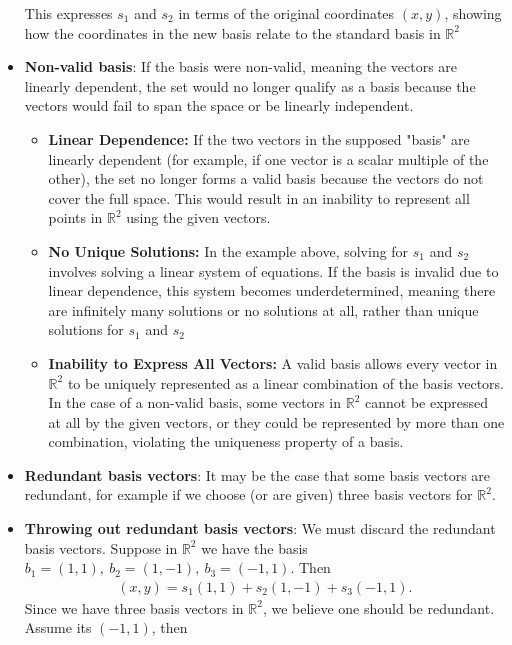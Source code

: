 \documentclass{report}
\begin{document}
\begin{itemize}
            This expresses $s_1$ and $s_2$ in terms of the original coordinates $(x,y)$, showing how the coordinates in the new basis relate to the standard basis in $\mathbb{R}^{2}$
        \item \textbf{Non-valid basis}: If the basis were non-valid, meaning the vectors are linearly dependent, the set would no longer qualify as a basis because the vectors would fail to span the space or be linearly independent.
            \bigbreak \noindent 
            \begin{itemize}
                \item \textbf{Linear Dependence:} If the two vectors in the supposed "basis" are linearly dependent (for example, if one vector is a scalar multiple of the other), the set no longer forms a valid basis because the vectors do not cover the full space. This would result in an inability to represent all points in $\mathbb{R}^{2}$ using the given vectors.
                \item \textbf{No Unique Solutions:} In the example above, solving for $s_1$ and $s_2$ involves solving a linear system of equations. If the basis is invalid due to linear dependence, this system becomes underdetermined, meaning there are infinitely many solutions or no solutions at all, rather than unique  solutions for $s_1$ and $s_2$
                \item \textbf{Inability to Express All Vectors:} A valid basis allows every vector in $\mathbb{R}^{2}$ to be uniquely represented as a linear combination of the basis vectors. In the case of a non-valid basis, some vectors in $\mathbb{R}^{2}$ cannot be expressed at all by the given vectors, or they could be represented by more than one combination, violating the uniqueness property of a basis.
            \end{itemize}
        \item \textbf{Redundant basis vectors}: It may be the case that some basis vectors are redundant, for example if we choose (or are given) three basis vectors for $\mathbb{R}^{2}$.
        \item \textbf{Throwing out redundant basis vectors}: We must discard the redundant basis vectors. Suppose in $\mathbb{R}^{2}$ we have the basis $b_{1} = (1,1),\ b_{2} = (1,-1),\ b_{3} = (-1,1)$. Then
            \begin{align*}
                (x,y) = s_{1}(1,1) + s_{2}(1,-1) + s_{3}(-1,1)
            .\end{align*}
            \bigbreak \noindent 
            Since we have three basis vectors in $\mathbb{R}^{2}$, we believe one should be redundant. Assume its $(-1,1)$, then

\end{itemize}
\end{document}
